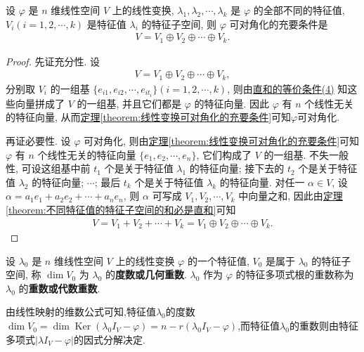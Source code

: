\documentclass[../../main.tex]{subfiles}%
\begin{document}
\begin{theorem}[线性变换可对角化的充要条件]\label{theorem:线性变换可对角化的充要条件2}
设 $\varphi$ 是 $n$ 维线性空间 $V$ 上的线性变换, $\lambda_1, \lambda_2, \cdots, \lambda_k$ 是 $\varphi$ 的全部不同的特征值, $V_i (i = 1, 2, \cdots, k)$ 是特征值 $\lambda_i$ 的特征子空间, 则 $\varphi$ 可对角化的充要条件是
\begin{align*}
V = V_1 \oplus V_2 \oplus \cdots \oplus V_k.
\end{align*}
\end{theorem}
\begin{proof}
先证充分性. 设
\begin{align*}
V = V_1 \oplus V_2 \oplus \cdots \oplus V_k,
\end{align*}
分别取 $V_i$ 的一组基 $\{e_{i1}, e_{i2}, \cdots, e_{it_i}\} (i = 1, 2, \cdots, k)$, 则由\hyperref[theorem:直和的等价条件]{直和的等价条件(4)} 知这些向量拼成了 $V$ 的一组基, 并且它们都是 $\varphi$ 的特征向量. 因此 $\varphi$ 有 $n$ 个线性无关的特征向量, 从而\hyperref[theorem:线性变换可对角化的充要条件]{定理\ref{theorem:线性变换可对角化的充要条件}}可知$\varphi$可对角化.

再证必要性. 设 $\varphi$ 可对角化, 则由\hyperref[theorem:线性变换可对角化的充要条件]{定理\ref{theorem:线性变换可对角化的充要条件}}可知$\varphi$ 有 $n$ 个线性无关的特征向量 $\{e_1, e_2, \cdots, e_n\}$, 它们构成了 $V$ 的一组基. 不失一般性, 可设这组基中前 $t_1$ 个是关于特征值 $\lambda_1$ 的特征向量; 接下去的 $t_2$ 个是关于特征值 $\lambda_2$ 的特征向量; $\cdots$; 最后 $t_k$ 个是关于特征值 $\lambda_k$ 的特征向量. 对任一 $\alpha \in V$, 设 $\alpha = a_1 e_1 + a_2 e_2 + \cdots + a_n e_n$, 则 $\alpha$ 可写成 $V_1, V_2, \cdots, V_k$ 中向量之和, 因此由\hyperref[theorem:不同特征值的特征子空间的和必是直和]{定理\ref{theorem:不同特征值的特征子空间的和必是直和}}可知
\begin{align*}
V = V_1 + V_2 + \cdots + V_k = V_1 \oplus V_2 \oplus \cdots \oplus V_k.
\end{align*}
\end{proof}


\begin{definition}[线性变换的几何重数与代数重数]
设 $\lambda_0$ 是 $n$ 维线性空间 $V$ 上的线性变换 $\varphi$ 的一个特征值, $V_0$ 是属于 $\lambda_0$ 的特征子空间, 称 $\dim V_0$ 为 $\lambda_0$ 的\textbf{度数或几何重数}. $\lambda_0$ 作为 $\varphi$ 的特征多项式根的重数称为 $\lambda_0$ 的\textbf{重数或代数重数}.
\end{definition}
\begin{note}
由线性映射的维数公式可知,特征值$\lambda_0$的度数$\dim V_0 = \dim \operatorname{Ker}(\lambda_0 I_V - \varphi) = n - r(\lambda_0 I_V - \varphi)$,而特征值$\lambda_0$的重数则由特征多项式$|\lambda I_V - \varphi|$的因式分解决定.
\end{note}
\end{document}
